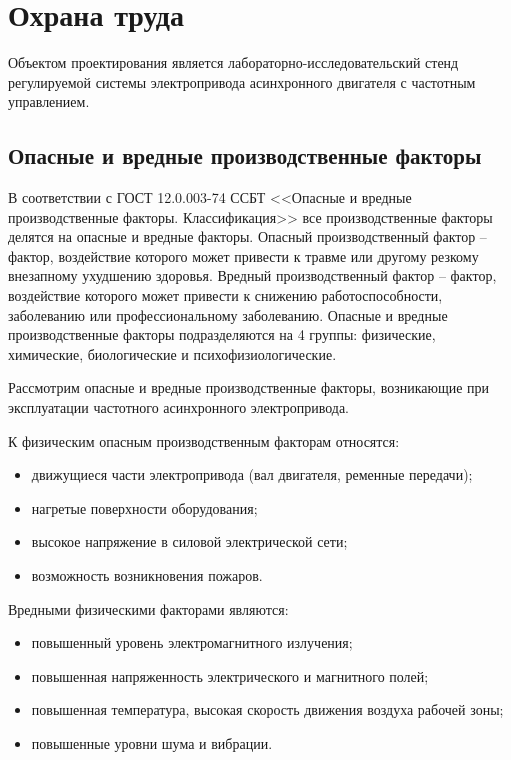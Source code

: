 \section{Охрана труда}
        Объектом проектирования является лабораторно-исследовательский 
        стенд регулируемой системы электропривода асинхронного двигателя с
        частотным управлением.

    \subsection{Опасные и вредные производственные факторы}
        В соответствии с ГОСТ 12.0.003-74 ССБТ <<Опасные и вредные
        производственные факторы.  Классификация>> все производственные факторы
        делятся на опасные и вредные факторы. Опасный производственный фактор –
        фактор, воздействие которого может привести к травме или другому
        резкому внезапному ухудшению здоровья. Вредный производственный фактор
        – фактор, воздействие которого может привести к снижению
        работоспособности, заболеванию или профессиональному заболеванию.
        Опасные и вредные производственные факторы подразделяются на 4 группы:
        физические, химические, биологические и психофизиологические. 

        Рассмотрим опасные и вредные производственные факторы, возникающие при
        эксплуатации частотного асинхронного электропривода.

        К физическим опасным производственным факторам относятся:
        \begin{itemize}
            \item движущиеся части электропривода  (вал двигателя, ременные
                передачи);
            \item нагретые поверхности оборудования;
            \item высокое напряжение в силовой электрической сети; 
            \item возможность возникновения пожаров.
        \end{itemize}

       Вредными физическими факторами являются:
        \begin{itemize}
            \item повышенный уровень электромагнитного излучения;
            \item повышенная напряженность электрического и магнитного полей;
            \item повышенная температура, высокая скорость движения воздуха
                рабочей зоны;
            \item повышенные уровни шума и вибрации.
        \end{itemize}

